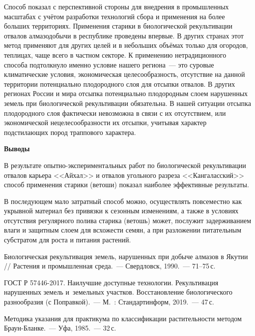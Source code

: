 

Способ показал с перспективной стороны для внедрения в промышленных масштабах с учётом разработки технологий сбора и применения на более больших территориях. Применения старики в биологической рекультивации отвалов алмазодобычи в республике проведены впервые. В других странах этот метод применяют для других целей и в небольших объёмах только для огородов, теплицах, чаще всего в частном секторе. К применению нетрадиционного способа подтолкнуло именно условие нашего региона~--- это суровые климатические условия, экономическая целесообразность, отсутствие на данной территории потенциально плодородного слоя для отсыпки отвалов.
\clearpage
В других регионах России и мира отсыпка потенциально плодородным слоем нарушенных земель при биологической рекультивации обязательна. В нашей ситуации отсыпка плодородного слоя фактически невозможна в связи с их отсутствием, или экономической нецелесообразности их отсыпки, учитывая характер подстилающих пород траппового характера.

\textbf{Выводы}

В результате опытно-экспериментальных работ по биологической рекультивации отвалов карьера <<Айхал>> и отвалов угольного разреза <<Кангаласский>> способ применения старики (ветоши) показал наиболее эффективные результаты.

В последующем мало затратный способ можно, осуществлять повсеместно как укрывной материал без привязки к сезонным изменениям, а также в условиях отсутствия регулярного полива старика (ветошь) может, послужит задерживанием влаги и защитным слоем для всхожести семян, а при разложении питательным субстратом для роста и питания растений.

\begin{thebibliography}{99}

\bibitem{}
 Биологическая рекультивация земель, нарушенных при добыче алмазов в Якутии // Растения и промышленная среда.~--- Свердловск, 1990.~--- 71--75\,с.

\bibitem{}
ГОСТ Р 57446-2017. Наилучшие доступные технологии. Рекультивация нарушенных земель и~земельных участков. Восстановление биологического разнообразия (с Поправкой).~--- М.~: Стандартинформ, 2019.~--- 47\,с.

\bibitem{}
 Методика указания для практикума по классификации растительности методом Браун-Бланке.~--- Уфа, 1985.~--- 32\,с.
\end{thebibliography}
\thispagestyle{empty}
